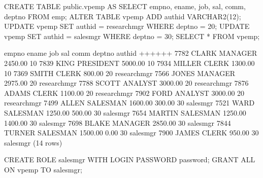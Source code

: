 \documentclass[letterpaper,10pt,english,openany,oneside]{sphinxmanual}
\begin{document}
%
\begin{sphinxVerbatim}[commandchars=\\\{\}]
CREATE TABLE public.vpemp AS SELECT empno, ename, job, sal, comm, deptno FROM emp;
ALTER TABLE vpemp ADD authid VARCHAR2(12);
UPDATE vpemp SET authid = \PYGZsq{}researchmgr\PYGZsq{} WHERE deptno = 20;
UPDATE vpemp SET authid = \PYGZsq{}salesmgr\PYGZsq{} WHERE deptno = 30;
SELECT * FROM vpemp;

empno \textbar{} ename  \textbar{}    job    \textbar{}   sal   \textbar{}  comm   \textbar{} deptno \textbar{}   authid
\PYGZhy{}\PYGZhy{}\PYGZhy{}\PYGZhy{}\PYGZhy{}\PYGZhy{}\PYGZhy{}+\PYGZhy{}\PYGZhy{}\PYGZhy{}\PYGZhy{}\PYGZhy{}\PYGZhy{}\PYGZhy{}\PYGZhy{}+\PYGZhy{}\PYGZhy{}\PYGZhy{}\PYGZhy{}\PYGZhy{}\PYGZhy{}\PYGZhy{}\PYGZhy{}\PYGZhy{}\PYGZhy{}\PYGZhy{}+\PYGZhy{}\PYGZhy{}\PYGZhy{}\PYGZhy{}\PYGZhy{}\PYGZhy{}\PYGZhy{}\PYGZhy{}\PYGZhy{}+\PYGZhy{}\PYGZhy{}\PYGZhy{}\PYGZhy{}\PYGZhy{}\PYGZhy{}\PYGZhy{}\PYGZhy{}\PYGZhy{}+\PYGZhy{}\PYGZhy{}\PYGZhy{}\PYGZhy{}\PYGZhy{}\PYGZhy{}\PYGZhy{}\PYGZhy{}+\PYGZhy{}\PYGZhy{}\PYGZhy{}\PYGZhy{}\PYGZhy{}\PYGZhy{}\PYGZhy{}\PYGZhy{}\PYGZhy{}\PYGZhy{}\PYGZhy{}\PYGZhy{}\PYGZhy{}
  7782 \textbar{} CLARK  \textbar{} MANAGER   \textbar{} 2450.00 \textbar{}         \textbar{}     10 \textbar{}
  7839 \textbar{} KING   \textbar{} PRESIDENT \textbar{} 5000.00 \textbar{}         \textbar{}     10 \textbar{}
  7934 \textbar{} MILLER \textbar{} CLERK     \textbar{} 1300.00 \textbar{}         \textbar{}     10 \textbar{}
  7369 \textbar{} SMITH  \textbar{} CLERK     \textbar{}  800.00 \textbar{}         \textbar{}     20 \textbar{} researchmgr
  7566 \textbar{} JONES  \textbar{} MANAGER   \textbar{} 2975.00 \textbar{}         \textbar{}     20 \textbar{} researchmgr
  7788 \textbar{} SCOTT  \textbar{} ANALYST   \textbar{} 3000.00 \textbar{}         \textbar{}     20 \textbar{} researchmgr
  7876 \textbar{} ADAMS  \textbar{} CLERK     \textbar{} 1100.00 \textbar{}         \textbar{}     20 \textbar{} researchmgr
  7902 \textbar{} FORD   \textbar{} ANALYST   \textbar{} 3000.00 \textbar{}         \textbar{}     20 \textbar{} researchmgr
  7499 \textbar{} ALLEN  \textbar{} SALESMAN  \textbar{} 1600.00 \textbar{}  300.00 \textbar{}     30 \textbar{} salesmgr
  7521 \textbar{} WARD   \textbar{} SALESMAN  \textbar{} 1250.00 \textbar{}  500.00 \textbar{}     30 \textbar{} salesmgr
  7654 \textbar{} MARTIN \textbar{} SALESMAN  \textbar{} 1250.00 \textbar{} 1400.00 \textbar{}     30 \textbar{} salesmgr
  7698 \textbar{} BLAKE  \textbar{} MANAGER   \textbar{} 2850.00 \textbar{}         \textbar{}     30 \textbar{} salesmgr
  7844 \textbar{} TURNER \textbar{} SALESMAN  \textbar{} 1500.00 \textbar{}    0.00 \textbar{}     30 \textbar{} salesmgr
  7900 \textbar{} JAMES  \textbar{} CLERK     \textbar{}  950.00 \textbar{}         \textbar{}     30 \textbar{} salesmgr
(14 rows)

CREATE ROLE salesmgr WITH LOGIN PASSWORD \PYGZsq{}password\PYGZsq{};
GRANT ALL ON vpemp TO salesmgr;
\end{sphinxVerbatim}
\end{document}
